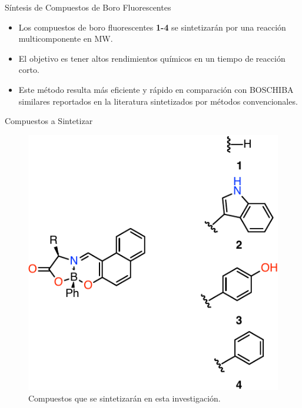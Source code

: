 \documentclass[%
spanish,
mexico]{beamer}
\begin{document}
\begin{frame}{Síntesis de Compuestos de Boro Fluorescentes}
    \begin{itemize}
        \item Los compuestos de boro fluorescentes \textbf{1-4} se sintetizarán por una reacción multicomponente en \gls{MW}.
        \item El objetivo es tener altos rendimientos químicos en un tiempo de reacción corto.
        \item Este método resulta más eficiente y rápido en comparación con \gls{BOSCHIBA} similares reportados en la literatura sintetizados por métodos convencionales.
    \end{itemize}
\end{frame}

\begin{frame}{Compuestos a Sintetizar}
    \begin{figure}
        \centering
        \includegraphics[width=0.5\linewidth]{./Figuras/Marcha.pdf}
        \caption{Compuestos que se sintetizarán en esta investigación.}
        \label{sch:marcha}
    \end{figure}
\end{frame}
\end{document}
